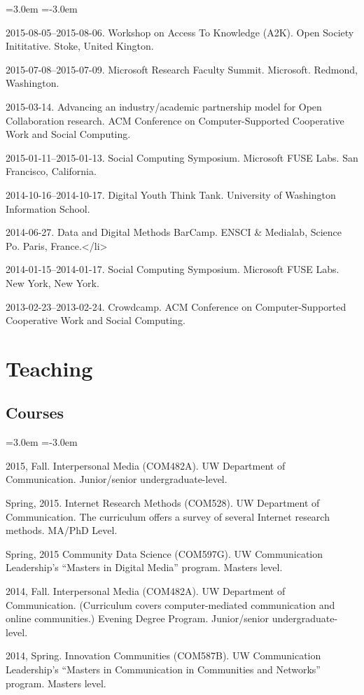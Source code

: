 \documentclass[10pt]{article}
\newenvironment{cvlist}{
\begin{list}{}{\leftmargin=3.0em \itemindent=-3.0em}
  \setlength{\itemsep}{0pt}
  \setlength{\parskip}{0em}
  \setlength{\parsep}{1em}
  \setlength{\parindent}{0em}}
{\vspace{1em}
\end{list}}
\begin{document}
\begin{cvlist}
\item 2015-08-05--2015-08-06. Workshop on Access To Knowledge (A2K). Open Society Inititative. Stoke, United Kington.
\item 2015-07-08--2015-07-09. Microsoft Research Faculty Summit. Microsoft. Redmond, Washington.
\item 2015-03-14. Advancing an industry/academic partnership model for Open Collaboration research. ACM Conference on Computer-Supported Cooperative Work and Social Computing.
\item 2015-01-11--2015-01-13. Social Computing Symposium. Microsoft FUSE Labs. San Francisco, California.
\item 2014-10-16--2014-10-17. Digital Youth Think Tank. University of Washington Information School.
\item 2014-06-27. Data and Digital Methods BarCamp. ENSCI \& Medialab, Science Po. Paris, France.</li>
\item 2014-01-15--2014-01-17. Social Computing Symposium. Microsoft FUSE Labs. New York, New York.
\item 2013-02-23--2013-02-24. Crowdcamp. ACM Conference on Computer-Supported Cooperative Work and Social Computing.
\end{cvlist}

\section{Teaching}

\subsection{Courses}
\begin{cvlist}
\item 2015, Fall. Interpersonal Media (COM482A). UW Department of Communication. Junior/senior undergraduate-level.
\item Spring, 2015. Internet Research Methods (COM528). UW Department of Communication. The curriculum offers a survey of several Internet research methods. MA/PhD Level.
\item Spring, 2015 Community Data Science (COM597G). UW Communication Leadership's ``Masters in Digital Media'' program.  Masters level.
\item 2014, Fall. Interpersonal Media (COM482A). UW Department of Communication. (Curriculum covers computer-mediated communication and online communities.)  Evening Degree Program. Junior/senior undergraduate-level.
\item 2014, Spring. Innovation Communities (COM587B). UW Communication Leadership's ``Masters in Communication in Communities and Networks'' program. Masters level. 
\end{cvlist}
\end{document}
